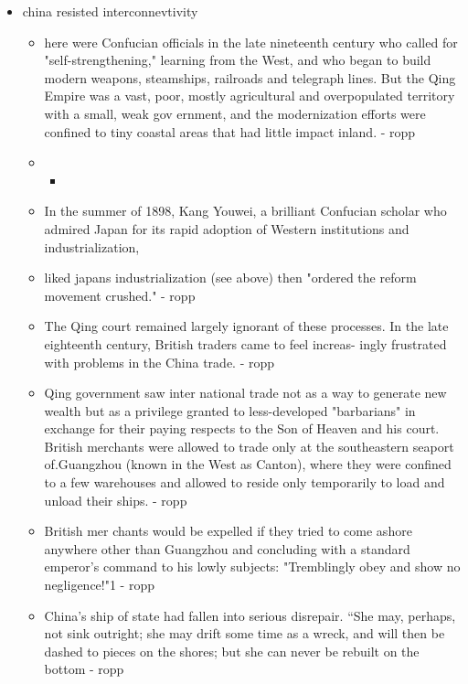 \documentclass[letterpaper]{article}
\begin{document}
\begin{itemize}
\item china resisted interconnevtivity

\begin{itemize}
\item here were Confucian officials in the late nineteenth century who
called for "self-strengthening," learning from the West, and who
began to build modern weapons, steamships, railroads and telegraph
lines. But the Qing Empire was a vast, poor, mostly agricultural and
overpopulated territory with a small, weak gov ernment, and the
modernization efforts were confined to tiny coastal areas that had
little impact inland. - ropp

\item \begin{itemize}
\item 
\end{itemize}

\item In the summer of 1898, Kang Youwei, a brilliant Confucian scholar
who admired Japan for its rapid adoption of Western institutions and
industrialization,

\item liked japans industrialization (see above) then "ordered the reform
movement crushed." - ropp

\item The Qing court remained largely ignorant of these processes. In the
late eighteenth century, British traders came to feel increas- ingly
frustrated with problems in the China trade. - ropp

\item Qing government saw inter national trade not as a way to generate
new wealth but as a privilege granted to less-developed "barbarians"
in exchange for their paying respects to the Son of Heaven and his
court. British merchants were allowed to trade only at the
southeastern seaport of.Guangzhou (known in the West as Canton),
where they were confined to a few warehouses and allowed to reside
only temporarily to load and unload their ships. - ropp

\item British mer chants would be expelled if they tried to come ashore
anywhere other than Guangzhou and concluding with a standard
emperor's command to his lowly subjects: "Tremblingly obey and show
no negligence!"1 - ropp

\item China's ship of state had fallen into serious disrepair. “She may,
perhaps, not sink outright; she may drift some time as a wreck, and
will then be dashed to pieces on the shores; but she can never be
rebuilt on the bottom - ropp
\end{itemize}


\end{itemize}
\end{document}
